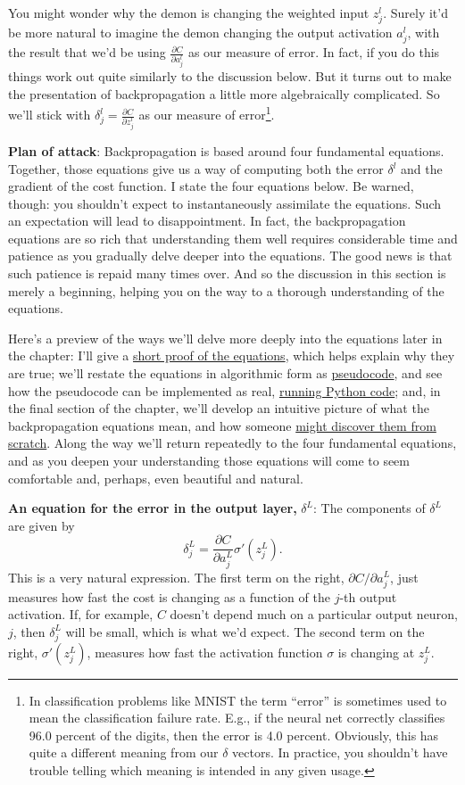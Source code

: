 \documentclass[a4paper,twoside,10pt]{book}
\begin{document}
You might wonder why the demon is changing the weighted input $z^l_j$. Surely it'd be more natural to imagine the demon changing the output activation $a^l_j$, with the result that we'd be using $\frac{\partial{}C}{\partial{}a^l_j}$ as our measure of error. In fact, if you do this things work out quite similarly to the discussion below. But it turns out to make the presentation of backpropagation a little more algebraically complicated. So we'll stick with $\delta^l_j=\frac{\partial{}C}{\partial{}z^l_j}$ as our measure of error\footnote{In classification problems like MNIST the term ``error'' is sometimes used to mean the classification failure rate. E.g., if the neural net correctly classifies 96.0 percent of the digits, then the error is 4.0 percent. Obviously, this has quite a different meaning from our $\delta$ vectors. In practice, you shouldn't have trouble telling which meaning is intended in any given usage.}.

\textbf{Plan of attack}: Backpropagation is based around four fundamental equations. Together, those equations give us a way of computing both the error $\delta{}^l$ and the gradient of the cost function. I state the four equations below. Be warned, though: you shouldn't expect to instantaneously assimilate the equations. Such an expectation will lead to disappointment. In fact, the backpropagation equations are so rich that understanding them well requires considerable time and patience as you gradually delve deeper into the equations. The good news is that such patience is repaid many times over. And so the discussion in this section is merely a beginning, helping you on the way to a thorough understanding of the equations.

Here's a preview of the ways we'll delve more deeply into the equations later in the chapter: I'll give a \hyperref[sec:2.5]{short proof of the equations}, which helps explain why they are true; we'll restate the equations in algorithmic form as \hyperref[sec:2.6]{pseudocode}, and see how the pseudocode can be implemented as real, \hyperref[sec:2.7]{running Python code}; and, in the final section of the chapter, we'll develop an intuitive picture of what the backpropagation equations mean, and how someone \hyperref[sec:2.9]{might discover them from scratch}. Along the way we'll return repeatedly to the four fundamental equations, and as you deepen your understanding those equations will come to seem comfortable and, perhaps, even beautiful and natural.

\textbf{An equation for the error in the output layer,} $\delta^L$: The components of $\delta^L$ are given by
\begin{equation}
	\delta^L_j = \frac{\partial C}{\partial a^L_j} \sigma'(z^L_j).
	\tag{BP1}\label{eq:BP1}
\end{equation}
This is a very natural expression. The first term on the right, $\partial{}C/\partial{}a^L_j$, just measures how fast the cost is changing as a function of the $j$-th output activation. If, for example, $C$ doesn't depend much on a particular output neuron, $j$, then $\delta^L_j$ will be small, which is what we'd expect. The second term on the right, $\sigma'(z^L_j)$, measures how fast the activation function $\sigma$ is changing at $z^L_j$.
\end{document}
